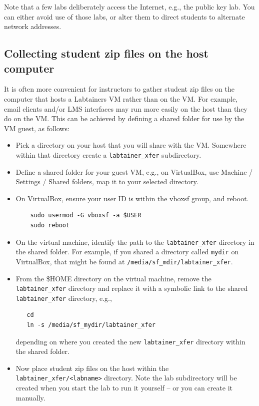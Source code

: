 \documentclass[12pt]{article}
\begin{document}
Note that a few labs deliberately access the Internet, e.g., the public key lab.  You can either avoid use
of those labs, or alter them to direct students to alternate network addresses.

\subsection{Collecting student zip files on the host computer}
\label{shared_labtainer_xfer}
It is often more convenient for instructors to gather student zip files on the computer that hosts a Labtainers
VM rather than on the VM.  For example, email clients and/or LMS interfaces may run more easily on the host than
they do on the VM.  This can be achieved by defining a shared folder for use by the VM guest, as follows:
\begin{itemize}
\item Pick a directory on your host that you will share with the VM. Somewhere within that directory create a
{\tt labtainer\_xfer} subdirectory.
\item Define a shared folder for your guest VM, e.g., on VirtualBox, use Machine / Settings / Shared folders, map it
to your selected directory.  
\item On VirtualBox, ensure your user ID is within the vboxsf group, and reboot.
\begin{verbatim}
    sudo usermod -G vboxsf -a $USER
    sudo reboot
\end{verbatim}
\item On the virtual machine, identify the path to the {\tt labtainer\_xfer} directory in the shared folder.  For example,
if you shared a directory called {\tt mydir} on VirtualBox, that might be found at {\tt /media/sf\_mdir/labtainer\_xfer}.
\item From the \$HOME directory on the virtual machine, remove the {\tt labtainer\_xfer} directory and replace it with
a symbolic link to the shared {\tt labtainer\_xfer} directory, e.g.,
\begin{verbatim}
   cd 
   ln -s /media/sf_mydir/labtainer_xfer
\end{verbatim}
\noindent depending on where you created the new {\tt labtainer\_xfer} directory within the shared folder.
\item Now place student zip files on the host within the {\tt labtainer\_xfer/<labname>} directory.  Note
the lab subdirectory will be created when you start the lab to run it yourself -- or you can create it manually.
\end{itemize}
\end{document}
